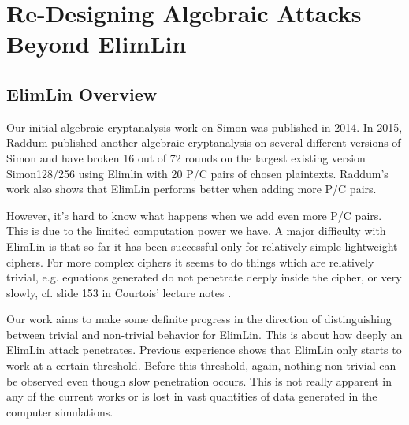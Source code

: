 \chapter{Re-Designing Algebraic Attacks Beyond ElimLin} \label{ch:ElimLIn}
\section{ElimLin Overview}
Our initial algebraic cryptanalysis work on Simon was published in 2014. In 2015,   Raddum \cite{RaddumSimon} published another algebraic cryptanalysis on several different versions of Simon and have broken 16 out of 72 rounds on the largest existing version Simon128/256 using Elimlin with 20 P/C pairs of chosen plaintexts. Raddum's work also shows that ElimLin performs better when adding more P/C pairs.  


 
However, it's hard to know what happens when we add even more P/C pairs. This is due to the limited computation power we have. A major difficulty with ElimLin is that so far it has been successful only for relatively simple lightweight ciphers.
For more complex ciphers
it seems to do things which are relatively trivial,
e.g. equations generated do not penetrate deeply inside the cipher, or very slowly,
cf. %
slide 153 in Courtois' lecture notes \cite{SlidesAlgAllteach}.

Our work aims to make some definite progress in the direction of distinguishing between trivial and non-trivial behavior for ElimLin. This is about how deeply an ElimLin attack penetrates. Previous experience shows that ElimLin only starts to work at a certain threshold. Before this threshold, again, nothing non-trivial can be observed even though slow penetration occurs. This is not really apparent in any of the current works or is lost in vast quantities of data generated in the computer simulations. 

